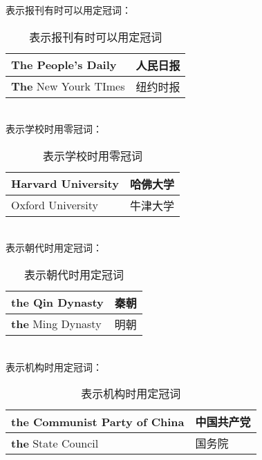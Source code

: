 \documentclass[UTF8]{ctexart}
\begin{document}
    表示报刊有时可以用定冠词：
    \begin{table}[h!]
        \begin{center}
            \ttfamily
            \begin{tabular}{p{180pt}|p{100pt}}
                \hline
                \textbf{The} People's Daily&人民日报\\ \hline
                \textbf{The} New Yourk TImes&纽约时报\\ \hline
            \end{tabular}
            \rmfamily
            \caption{表示报刊有时可以用定冠词}
        \end{center}
    \end{table}\\
    表示学校时用零冠词：
    \begin{table}[h!]
        \begin{center}
            \ttfamily
            \begin{tabular}{p{180pt}|p{100pt}}
                \hline
                Harvard University&哈佛大学\\ \hline
                Oxford University&牛津大学\\ \hline
            \end{tabular}
            \rmfamily
            \caption{表示学校时用零冠词}
        \end{center}
    \end{table}\\
    表示朝代时用定冠词：
    \begin{table}[h!]
        \begin{center}
            \ttfamily
            \begin{tabular}{p{180pt}|p{100pt}}
                \hline
                \textbf{the} Qin Dynasty&秦朝\\ \hline
                \textbf{the} Ming Dynasty&明朝\\ \hline
            \end{tabular}
            \rmfamily
            \caption{表示朝代时用定冠词}
        \end{center}
    \end{table}\\
    表示机构时用定冠词：
    \begin{table}[h!]
        \begin{center}
            \ttfamily
            \begin{tabular}{p{180pt}|p{100pt}}
                \hline
                \textbf{the} Communist Party of China&中国共产党\\ \hline
                \textbf{the} State Council&国务院\\ \hline
            \end{tabular}
            \rmfamily
            \caption{表示机构时用定冠词}
        \end{center}
    \end{table}\\
\end{document}
